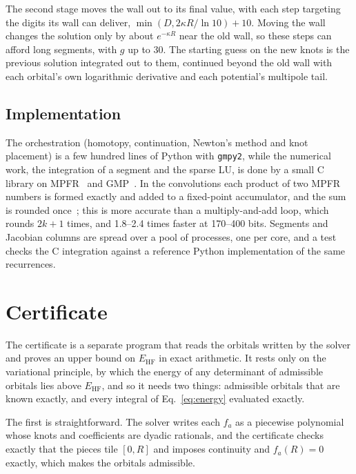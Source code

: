 \documentclass[aps,pra,reprint,superscriptaddress,amsmath,amssymb,longbibliography]{revtex4-2}
\newcommand{\EHF}{E_\mathrm{HF}}
\begin{document}
The second stage moves the wall out to its final value, with each step targeting the digits its wall can deliver, $\min(D,2\kappa R/\ln10)+10$. Moving the wall changes the solution only by about $e^{-\kappa R}$ near the old wall, so these steps can afford long segments, with $g$ up to 30. The starting guess on the new knots is the previous solution integrated out to them, continued beyond the old wall with each orbital's own logarithmic derivative and each potential's multipole tail.

\subsection{Implementation}

The orchestration (homotopy, continuation, Newton's method and knot placement) is a few hundred lines of Python with \texttt{gmpy2}, while the numerical work, the integration of a segment and the sparse LU, is done by a small C library on MPFR~\cite{MPFR} and GMP~\cite{GMP}. In the convolutions each product of two MPFR numbers is formed exactly and added to a fixed-point accumulator, and the sum is rounded once~\cite{Kulisch2013}; this is more accurate than a multiply-and-add loop, which rounds $2k+1$ times, and 1.8--2.4 times faster at 170--400 bits. Segments and Jacobian columns are spread over a pool of processes, one per core, and a test checks the C integration against a reference Python implementation of the same recurrences.

\section{Certificate}\label{sec:certify}

The certificate is a separate program that reads the orbitals written by the solver and proves an upper bound on $\EHF$ in exact arithmetic. It rests only on the variational principle, by which the energy of any determinant of admissible orbitals lies above $\EHF$, and so it needs two things: admissible orbitals that are known exactly, and every integral of Eq.~\eqref{eq:energy} evaluated exactly.

The first is straightforward. The solver writes each $f_a$ as a piecewise polynomial whose knots and coefficients are dyadic rationals, and the certificate checks exactly that the pieces tile $[0,R]$ and imposes continuity and $f_a(R)=0$ exactly, which makes the orbitals admissible.
\end{document}
